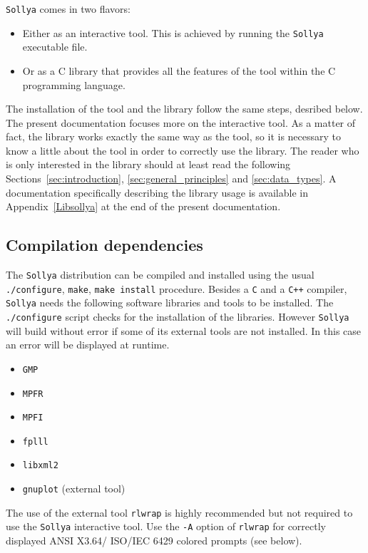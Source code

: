 \documentclass[a4paper]{article}
\newcommand{\sollya}{\texttt{Sollya}\xspace}
\begin{document}
\sollya comes in two flavors:
\begin{itemize}
\item Either as an interactive tool. This is achieved by running the \sollya executable file.
\item Or as a C library that provides all the features of the tool within the C programming language.
\end{itemize}

The installation of the tool and the library follow the same steps, desribed below. The present documentation focuses more on the interactive tool. As a matter of fact, the library works exactly the same way as the tool, so it is necessary to know a little about the tool in order to correctly use the library. The reader who is only interested in the library should at least read the following Sections~\ref{sec:introduction}, \ref{sec:general_principles} and \ref{sec:data_types}. A documentation specifically describing the library usage is available in Appendix~\ref{Libsollya} at the end of the present documentation.


\subsection{Compilation dependencies}

The \sollya distribution can be compiled and installed using the usual
\texttt{./configure}, \texttt{make}, \texttt{make install}
procedure. Besides a \texttt{C} and a \texttt{C++} compiler, \sollya needs the following
software libraries and tools to be installed. The \texttt{./configure}
script checks for the installation of the libraries. However \sollya
will build without error if some of its external tools are not
installed. In this case an error will be displayed at runtime.
\begin{itemize}
\item \texttt{GMP}
\item \texttt{MPFR}
\item \texttt{MPFI}
\item \texttt{fplll}
\item \texttt{libxml2}
\item \texttt{gnuplot} (external tool)
\end{itemize}
The use of the external tool \texttt{rlwrap} is highly recommended but
not required to use the \sollya interactive tool. Use the \texttt{-A}
option of \texttt{rlwrap} for correctly displayed ANSI X3.64/ ISO/IEC
6429 colored prompts (see below).
\end{document}
